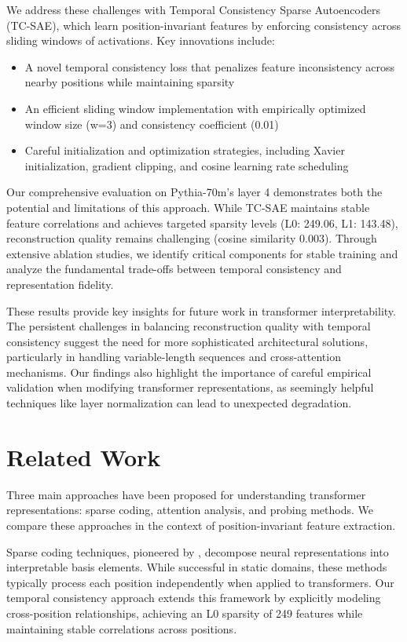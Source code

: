 \documentclass{article} %
\begin{document}
We address these challenges with Temporal Consistency Sparse Autoencoders (TC-SAE), which learn position-invariant features by enforcing consistency across sliding windows of activations. Key innovations include:
\begin{itemize}
    \item A novel temporal consistency loss that penalizes feature inconsistency across nearby positions while maintaining sparsity
    \item An efficient sliding window implementation with empirically optimized window size (w=3) and consistency coefficient (0.01)
    \item Careful initialization and optimization strategies, including Xavier initialization, gradient clipping, and cosine learning rate scheduling
\end{itemize}

Our comprehensive evaluation on Pythia-70m's layer 4 demonstrates both the potential and limitations of this approach. While TC-SAE maintains stable feature correlations and achieves targeted sparsity levels (L0: 249.06, L1: 143.48), reconstruction quality remains challenging (cosine similarity 0.003). Through extensive ablation studies, we identify critical components for stable training and analyze the fundamental trade-offs between temporal consistency and representation fidelity.

These results provide key insights for future work in transformer interpretability. The persistent challenges in balancing reconstruction quality with temporal consistency suggest the need for more sophisticated architectural solutions, particularly in handling variable-length sequences and cross-attention mechanisms. Our findings also highlight the importance of careful empirical validation when modifying transformer representations, as seemingly helpful techniques like layer normalization can lead to unexpected degradation.

\section{Related Work}
\label{sec:related}

Three main approaches have been proposed for understanding transformer representations: sparse coding, attention analysis, and probing methods. We compare these approaches in the context of position-invariant feature extraction.

Sparse coding techniques, pioneered by \cite{Olshausen1996EmergenceOS}, decompose neural representations into interpretable basis elements. While successful in static domains, these methods typically process each position independently when applied to transformers. Our temporal consistency approach extends this framework by explicitly modeling cross-position relationships, achieving an L0 sparsity of 249 features while maintaining stable correlations across positions.
\end{document}
